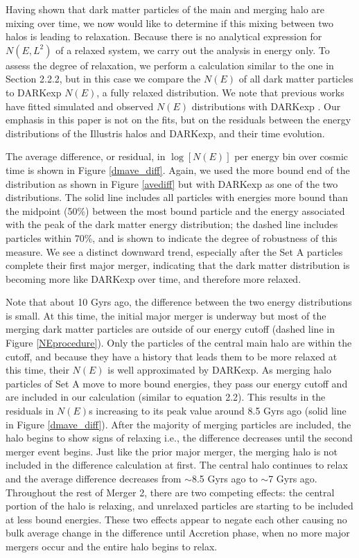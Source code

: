 \documentclass[a4paper,11pt]{article}
\begin{document}
Having shown that dark matter particles of the main and merging halo are mixing over time, we now would like to determine if this mixing between two halos is leading to 
relaxation.  Because there is no analytical expression for  $N(E,L^2)$ of a relaxed system, we carry out the analysis in energy 
only.  To assess the degree of relaxation, we perform a calculation similar to the one in Section 2.2.2, but in this case we compare the $N(E)$ of all dark matter particles 
to DARKexp $N(E)$, a fully relaxed distribution.  We note that previous works have fitted simulated and observed $N(E)$ distributions with 
DARKexp \citep{Ber13,Hjo15,Ume16,Nol16,You16}. Our emphasis in this paper is not on the fits, but on the residuals between the energy distributions of the 
Illustris halos and DARKexp, and their time evolution.

The average difference, or residual, in $\log[N(E)]$ per 
energy bin over cosmic time is shown in Figure \ref{dmave_diff}.  Again, we used the more bound end of the distribution as shown in Figure \ref{avediff} but 
with DARKexp as one of the two distributions.  The 
solid line includes all particles with energies more bound than the midpoint (50\%) between the most bound particle and the energy associated with the 
peak of the dark matter energy distribution; the dashed line includes particles within 70\%, and is shown to indicate the degree of robustness of this measure.  We see a distinct 
downward trend, especially after the Set A particles complete their first major merger, indicating that the dark matter distribution is becoming more like DARKexp 
over time, and therefore more relaxed.  

Note that about 10 Gyrs ago, the difference between the two energy distributions is small.  At this 
time, the initial major merger is underway but most of the merging dark matter particles are outside of our energy cutoff (dashed line in Figure \ref{NEprocedure}).  Only the particles of the central 
main halo are within the cutoff, and because they have a history that leads them to be more relaxed at this time, their $N(E)$ is well approximated by DARKexp.  
As merging halo particles of Set A move to more bound energies, they pass our 
energy cutoff and are included in our calculation (similar to equation 2.2).  This results in the residuals in $N(E)$s increasing to its peak 
value around 8.5 Gyrs ago (solid line in Figure \ref{dmave_diff}).  After the majority of merging particles are included, the halo begins to show signs of relaxing i.e., the difference decreases 
until the second merger event begins.  Just like the prior major merger, the merging halo is not included in the difference calculation at first.  The 
central halo continues to relax and the average difference decreases from $\sim$8.5 Gyrs ago to $\sim$7 Gyrs ago. Throughout the rest of Merger 2, there are 
two competing effects: the central portion of the halo is relaxing, and unrelaxed particles are starting to be included at less bound energies. These two 
effects appear to negate each other causing no bulk average change in the difference until Accretion phase, when no more major mergers occur and the entire halo 
begins to relax.  
\end{document}
